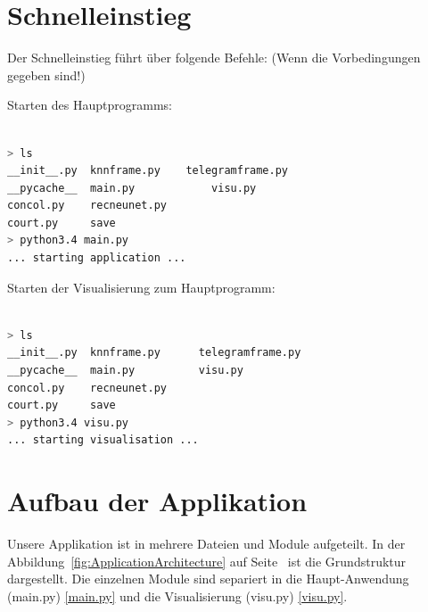 \documentclass[12pt,twoside]{article}
\theoremstyle{plain}
\theoremstyle{definition}
\theoremstyle{remark}
\begin{document}
 

\section{Schnelleinstieg}

Der Schnelleinstieg führt über folgende Befehle: (Wenn die Vorbedingungen gegeben sind!)


Starten des Hauptprogramms: 
\begin{lstlisting}[frame=single,language=bash]  % Start your code-block

> ls
__init__.py	 knnframe.py 	telegramframe.py
__pycache__	 main.py		    visu.py
concol.py	 recneunet.py
court.py	 save
> python3.4 main.py 
... starting application ...
\end{lstlisting}

Starten der Visualisierung zum Hauptprogramm:
\begin{lstlisting}[frame=single,language=bash]  % Start your code-block

> ls
__init__.py	 knnframe.py	  telegramframe.py
__pycache__	 main.py		  visu.py
concol.py	 recneunet.py
court.py	 save
> python3.4 visu.py 
... starting visualisation ...
\end{lstlisting}


\section{Aufbau der Applikation}

Unsere Applikation ist in mehrere Dateien und Module aufgeteilt. In der Abbildung~\ref{fig:ApplicationArchitecture} auf Seite~\pageref{fig:ApplicationArchitecture} ist die Grundstruktur dargestellt. Die einzelnen Module sind separiert in die Haupt-Anwendung (main.py) \ref{main.py} und die Visualisierung (visu.py) \ref{visu.py}.  
\end{document}
